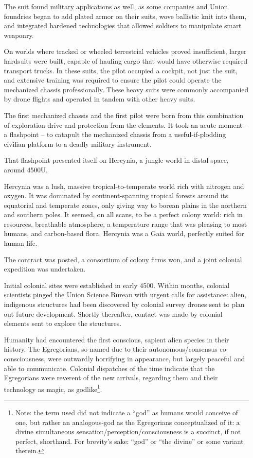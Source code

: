 The suit found military applications as well, as some companies and Union foundries began to
add plated armor on their suits, wove ballistic knit into them, and integrated hardened
technologies that allowed soldiers to manipulate smart weaponry.

On worlds where tracked or wheeled terrestrial vehicles proved insufficient, larger hardsuits were
built, capable of hauling cargo that would have otherwise required transport trucks. In these
suits, the pilot occupied a cockpit, not just the suit, and extensive training was required to ensure
the pilot could operate the mechanized chassis professionally. These heavy suits were commonly
accompanied by drone flights and operated in tandem with other heavy suits.

The first mechanized chassis and the first pilot were born from this combination of exploration
drive and protection from the elements. It took an acute moment -- a flashpoint -- to catapult the
mechanized chassis from a useful-if-plodding civilian platform to a deadly military instrument.

That flashpoint presented itself on Hercynia, a jungle world in distal space, around 4500U.

Hercynia was a lush, massive tropical-to-temperate world rich with nitrogen and oxygen. It was
dominated by continent-spanning tropical forests around its equatorial and temperate zones,
only giving way to borean plains in the northern and southern poles. It seemed, on all scans, to
be a perfect colony world: rich in resources, breathable atmosphere, a temperature range that
was pleasing to most humans, and carbon-based flora. Hercynia was a Gaia world, perfectly
suited for human life.

The contract was posted, a consortium of colony firms won, and a joint colonial expedition was
undertaken.

Initial colonial sites were established in early 4500. Within months, colonial scientists pinged the
Union Science Bureau with urgent calls for assistance: alien, indigenous structures had been
discovered by colonial survey drones sent to plan out future development. Shortly thereafter,
contact was made by colonial elements sent to explore the structures.

Humanity had encountered the first conscious, sapient alien species in their history. The
Egregorians, so-named due to their autonomous/consensus co-consciousness, were outwardly
horrifying in appearance, but largely peaceful and able to communicate. Colonial dispatches of
the time indicate that the Egregorians were reverent of the new arrivals, regarding them and their
technology as magic, as godlike\footnote{Note: the term used did not indicate a ``god'' as humans would conceive of one, but rather an analogous-god as the
Egregorians conceptualized of it: a divine simultaneous sensation/perception/consciousness is a succinct, if not
perfect, shorthand. For brevity's sake: ``god'' or ``the divine'' or some variant therein.}.

